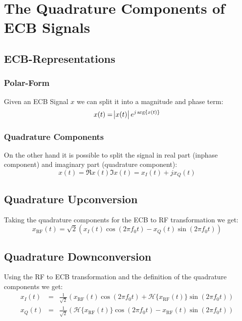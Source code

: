 \section{The Quadrature Components of ECB Signals}
\subsection{ECB-Representations}
\subsubsection{Polar-Form}
Given an ECB Signal $x$ we can split it into a magnitude and phase term:
\begin{equation}
    x(t) = \abs{x(t)} e^{j \arg\{x(t)\}}
\end{equation}

\subsubsection{Quadrature Components}
On the other hand it is possible to split the signal in real part (inphase component)
and imaginary part (quadrature component):
\begin{equation}
    x(t) = \Re{x(t)} \Im{x(t)} = x_I(t) + j x_Q(t)
\end{equation}

\subsection{Quadrature Upconversion}
Taking the quadrature components for the ECB to RF transformation we get:
\begin{equation}
    x_\text{RF}(t) = \sqrt{2}\left(x_I(t) \cos(2\pi f_0 t) - x_Q(t) \sin(2 \pi f_0 t)\right)
\end{equation}

\subsection{Quadrature Downconversion}
Using the RF to ECB transformation and the definition of the quadrature components we
get:
\begin{eqnarray}
    x_I(t) &=& \frac{1}{\sqrt{2}} \left(x_\text{RF}(t) \cos(2 \pi f_0 t) + 
        \mathcal{H}\{x_\text{RF}(t)\} \sin(2 \pi f_0 t)\right)\\ 
    x_Q(t) &=& \frac{1}{\sqrt{2}} \left(\mathcal{H}\{x_\text{RF}(t)\} \cos(2 \pi f_0 t)
        - x_\text{RF}(t) \sin(2 \pi f_0 t)\right)
\end{eqnarray}

